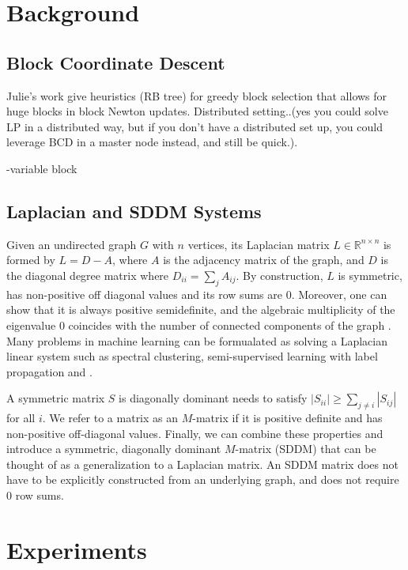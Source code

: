 \documentclass[11pt]{article}
\theoremstyle{definition}
\theoremstyle{definition}
\newcommand{\R}{\mathbb{R}}%
\begin{document}
\section{Background}
\subsection{Block Coordinate Descent}
Julie's work give heuristics (RB tree) for greedy block selection that allows for huge blocks in block Newton updates. Distributed setting..(yes you could solve LP in a distributed way, but if you don't have a distributed set up, you could leverage BCD in a master node instead, and still be quick.). 

-variable block
\subsection{Laplacian and SDDM Systems}
Given an undirected graph $G$ with $n$ vertices, its Laplacian matrix $L\in\R^{n\times n}$ is formed by $L=D-A$, where $A$ is the adjacency matrix of the graph, and $D$ is the diagonal degree matrix where $D_{ii}=\sum_{j}A_{ij}$. By construction, $L$ is symmetric, has non-positive off diagonal values and its row sums are $0$. Moreover, one can show that it is always positive semidefinite, and the algebraic multiplicity of the eigenvalue $0$ coincides with the number of connected components of the graph . Many problems in machine learning can be formualated as solving a Laplacian linear system such as spectral clustering, semi-supervised learning with label propagation and . 

A symmetric matrix $S$ is diagonally dominant needs to satisfy $|S_{ii}|\geq \sum_{j\neq i}|S_{ij}|$ for all $i$. We refer to a matrix as an $M$-matrix if it is positive definite and has non-positive off-diagonal values. Finally, we can combine these properties and introduce a symmetric, diagonally dominant $M$-matrix (SDDM) that can be thought of as a generalization to a Laplacian matrix. An SDDM matrix does not have to be explicitly constructed from an underlying graph, and does not require $0$ row sums. 


\section{Experiments}
\end{document}
